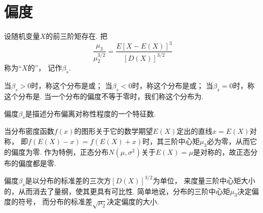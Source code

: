 \section{偏度}
\begin{definition}
设随机变量\(X\)的前三阶矩存在.
把\begin{equation*}
	\frac{\mu_3}{\mu_2^{3/2}}
	=\frac{E[X-E(X)]^3}{[D(X)]^{3/2}}
\end{equation*}称为“\(X\)的”，
记作\(\beta_s\).

当\(\beta_s>0\)时，称这个分布是或；
当\(\beta_s<0\)时，称这个分布是或；
当\(\beta_s=0\)时，称这个分布是.
当一个分布的偏度不等于零时，我们称这个分布为.
\end{definition}

偏度\(\beta_s\)是描述分布偏离对称性程度的一个特征数.

当分布密度函数\(f(x)\)的图形关于它的数学期望\(E(X)\)定出的直线\(x=E(X)\)对称，
即\(f(E(X)-x)=f(E(X)+x)\)时，其三阶中心矩\(\mu_3\)必为零，从而它的偏度为零.
作为特例，正态分布\(N(\mu,\sigma^2)\)关于\(E(X)=\mu\)是对称的，故正态分布的偏度都是零.

偏度\(\beta_s\)是以分布的标准差的三次方\([D(X)]^{3/2}\)为单位，
来度量三阶中心矩大小的，从而消去了量纲，使其更具有可比性.
简单地说，分布的三阶中心矩\(\mu_3\)决定偏度的符号，
而分布的标准差\(\sqrt{\mu_2}\)决定偏度的大小.

